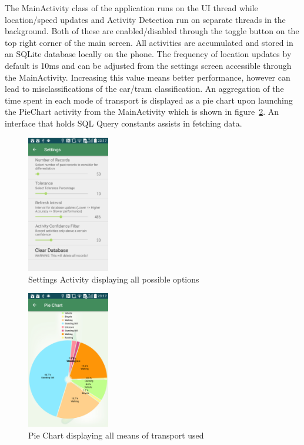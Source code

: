 \documentclass[10pt,conference,compsocconf]{IEEEtran}
\begin{document}
The MainActivity class of the application runs on the UI thread while location/speed updates and Activity Detection run on separate threads in the background. Both of these are enabled/disabled through the toggle button on the top right corner of the main screen. All activities are accumulated and stored in an SQLite database locally on the phone. The frequency of location updates by default is 10ms and can be adjusted from the settings screen accessible through the MainActivity. Increasing this value means better performance, however can lead to misclassifications of the car/tram classification. An aggregation of the time spent in each mode of transport is displayed as a pie chart upon launching the PieChart activity from the MainActivity which is shown in figure~\ref{fig:piechart}. An interface that holds SQL Query constants assists in fetching data.

\begin{figure}[h]
	\centering
	\includegraphics[width=\columnwidth, height=6cm, keepaspectratio]{ressources/SettingsActivity.png}
	\vspace{0em} %
	\caption{Settings Activity displaying all possible options}
	\label{fig:settings}
\end{figure}

\begin{figure}[h]
	\centering
	\includegraphics[width=\columnwidth, height=6cm, keepaspectratio]{ressources/PieChartActivity.png}
	\vspace{0em} %
	\caption{Pie Chart displaying all means of transport used}
	\label{fig:piechart}
\end{figure}
\end{document}
